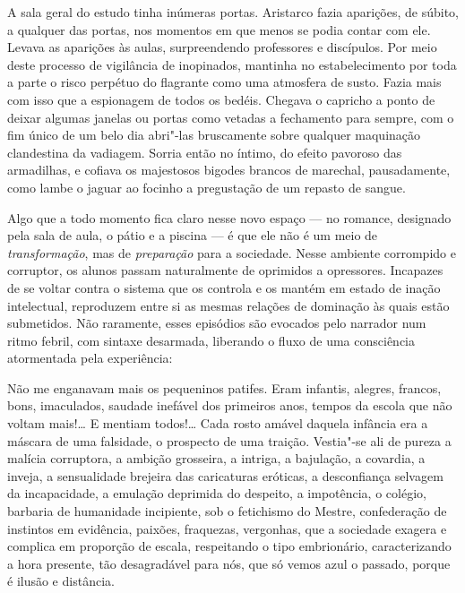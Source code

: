 \begin{hedraquote}
A sala geral do estudo tinha inúmeras portas. Aristarco fazia aparições,
de súbito, a qualquer das portas, nos momentos em que menos se podia
contar com ele. 
Levava as aparições às aulas, surpreendendo professores e discípulos.
Por meio deste processo de vigilância de inopinados, mantinha no
estabelecimento por toda a parte o risco perpétuo do flagrante como uma
atmosfera de susto. Fazia mais com isso que a espionagem de todos os
bedéis. Chegava o capricho a ponto de deixar algumas janelas ou portas
como vetadas a fechamento para sempre, com o fim único de um belo dia
abri"-las bruscamente sobre qualquer maquinação clandestina da
vadiagem. Sorria então no íntimo, do efeito pavoroso das armadilhas, e
cofiava os majestosos bigodes brancos de marechal, pausadamente, como
lambe o jaguar ao focinho a pregustação de um repasto de sangue.  
\end{hedraquote}

Algo que a todo momento fica claro nesse novo espaço ---
no romance, designado pela sala de aula, o pátio e a piscina --- é que
ele não é um meio de \textit{transformação},
mas de \textit{preparação} para a sociedade.
Nesse ambiente corrompido e corruptor, os alunos passam naturalmente de
oprimidos a opressores. Incapazes de se voltar contra o sistema que os
controla e os mantém em estado de inação intelectual, reproduzem entre
si as mesmas relações de dominação às quais estão submetidos. Não
raramente, esses episódios são evocados pelo narrador num ritmo febril,
com sintaxe desarmada, liberando o fluxo de uma consciência atormentada
pela experiência:

\begin{hedraquote}
Não me enganavam mais os pequeninos patifes. Eram infantis, alegres,
francos, bons, imaculados, saudade inefável dos primeiros anos, tempos
da escola que não voltam mais!\ldots{} E mentiam todos!\ldots{} Cada rosto amável
daquela infância era a máscara de uma falsidade, o prospecto de uma
traição. Vestia"-se ali de pureza a malícia corruptora, a ambição
grosseira, a intriga, a bajulação, a covardia, a inveja, a sensualidade
brejeira das caricaturas eróticas, a desconfiança selvagem da
incapacidade, a emulação deprimida do despeito, a impotência, o
colégio, barbaria de humanidade incipiente, sob o fetichismo do Mestre,
confederação de instintos em evidência, paixões, fraquezas, vergonhas,
que a sociedade exagera e complica em proporção de escala, respeitando
o tipo embrionário, caracterizando a hora presente, tão desagradável
para nós, que só vemos azul o passado, porque é ilusão e distância.
\end{hedraquote}

